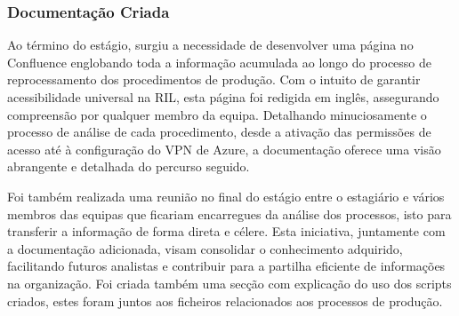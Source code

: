 
        \subsubsection{Documentação Criada}\label{secsec:documentação}
            
            Ao término do estágio, surgiu a necessidade de desenvolver uma página no Confluence englobando toda a informação acumulada ao longo do processo de reprocessamento dos procedimentos de produção. Com o intuito de garantir acessibilidade universal na RIL, esta página foi redigida em inglês, assegurando compreensão por qualquer membro da equipa. Detalhando minuciosamente o processo de análise de cada procedimento, desde a ativação das permissões de acesso até à configuração do VPN de Azure, a documentação oferece uma visão abrangente e detalhada do percurso seguido. 
            
            Foi também realizada uma reunião no final do estágio entre o estagiário e vários membros das equipas que ficariam encarregues da análise dos processos, isto para transferir a informação de forma direta e célere. Esta iniciativa, juntamente com a documentação adicionada, visam consolidar o conhecimento adquirido, facilitando futuros analistas e contribuir para a partilha eficiente de informações na organização. Foi criada também uma secção com explicação do uso dos scripts criados, estes foram juntos aos ficheiros relacionados aos processos de produção.

        
        



